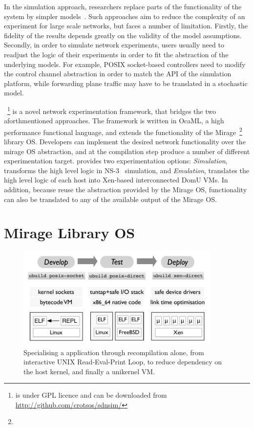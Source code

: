 In the simulation approach, researchers replace parts of the functionality of
the system by simpler models~\cite{Varga2008,issariyakul2012}.  Such
approaches aim to reduce the complexity of an experiment for large scale
networks, but faces a number of limitation.  Firstly, the fidelity of the
results depends greatly on the validity of the model assumptions. Secondly, in
order to simulate network experiments, users usually need to readjust the logic
of their experiments in order to fit the abstraction of the underlying models.
For example, POSIX socket-based controllers need to modify the control channel
abstraction in order to match the API of the simulation platform,
while forwarding plane traffic may have to be translated in a stochastic model. 

\sdnsim~\footnote{\sdnsim is under GPL licence and can be downloaded from
  \url{http://github.com/crotsos/sdnsim/}} is a novel network experimentation
framework, that bridges the two aforthmentioned approaches. The framework is
written in OcaML, a high performance functional language, and extends the
functionality of the Mirage~\footnote{\mirageurl} library OS. Developers can
implement the desired network functionality over the mirage OS abstraction, and
at the compilation step produce a number of different experimentation target.
\sdnsim provides two experimentation options: \emph{Simulation}, transforms
the high level logic in NS-3~\cite{ns3} simulation, and \emph{Emulation},
translates the high level logic of each host into Xen-based interconnected DomU
VMs. In addition, because \sdnsim reuse the abstraction provided by the Mirage
OS, functionality can also be translated to any of the available output of
the Mirage OS.

\section{Mirage Library OS} \label{sec:mirage-intro}

\begin{figure}
\includegraphics[width=0.9\textwidth]{mirage-toolchain}
\caption{Specialising a \mirage application through recompilation alone, from
  interactive UNIX Read-Eval-Print Loop, to reduce dependency on the host
  kernel, and finally a unikernel VM.}
\label{fig:mirage-toolchain}
\end{figure}

